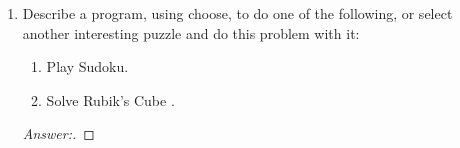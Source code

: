 \documentclass[10pt]{article}
\begin{document}
\begin{enumerate}
\begin{enumerate}
\item
FIN (the set of finite languages) under the function $oddsL$, defined on languages as follows: $oddsL(L) = \{w : \exists x \in L (w = odds(x))\}$ 
\begin{proof}[Answer:]
\end{proof}
\begin{proof}
\end{proof}

\item
* INF (the set of infinite languages) under the function $oddsL$.
\begin{proof}[Answer:]
\end{proof}
\begin{proof}
\end{proof}

\item
FIN under the function $maxstring$, defined in Example 8.22.
\begin{proof}[Answer:]
\end{proof}
\begin{proof}
\end{proof}

\item
INF under the function $maxstring$. 
\begin{proof}[Answer:]
\end{proof}
\begin{proof}
\end{proof}
\end{enumerate}


\item
Describe a program, using choose, to do one of the following, or select another interesting puzzle and do this problem with it:
\begin{enumerate}

\item
Play Sudoku.

\item
Solve Rubik's Cube \textregistered .
\end{enumerate}
\begin{proof}[Answer:]
\end{proof}
\end{enumerate}
\end{document}
